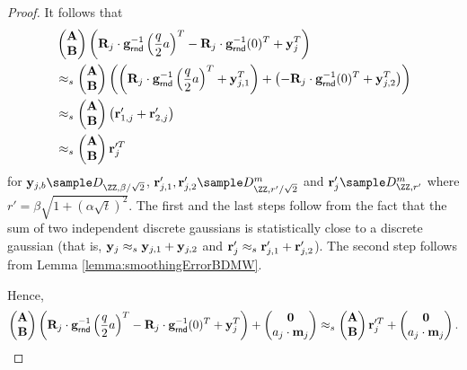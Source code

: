 \begin{proof}
      It follows that
      \begin{align*}
         & \begin{pmatrix} \mathbf{A} \\ \mathbf{B}\end{pmatrix}\left(\mathbf{R}_j\cdot\mathbf{g}^{-1}_\mathsf{rnd}\left(\frac{q}{2}a\right) ^T- \mathbf{R}_j\cdot \mathbf{g}^{-1}_\mathsf{rnd}(0)^T + \mathbf{y}_j^T \right) \\ &\approx_s\begin{pmatrix} \mathbf{A} \\ \mathbf{B}\end{pmatrix}\left(\left(\mathbf{R}_j\cdot\mathbf{g}^{-1}_\mathsf{rnd}\left(\frac{q}{2}a\right) ^T + \mathbf{y}_{j,1}^T\right)+\left(- \mathbf{R}_j\cdot \mathbf{g}^{-1}_\mathsf{rnd}(0)^T + \mathbf{y}_{j,2}^T\right) \right)\\ 
          &\approx_s \begin{pmatrix} \mathbf{A} \\ \mathbf{B}\end{pmatrix}\left(\mathbf{r}_{1,j}'+\mathbf{r}_{2,j}' \right)\\ 
          &\approx_s \begin{pmatrix}
    \mathbf{A} \\ \mathbf{B}
    \end{pmatrix}\mathbf{r}_j'^T
      \end{align*}  for $\yn_{j,b}\sample D_{\ZZ,\beta/\sqrt{2}}$, $\rn_{j,1}',\rn_{j,2}'\sample D_{\ZZ,r'/\sqrt{2}}^m$ and $\rn_j'\sample D_{\ZZ,r'}^m$ where $r'=\beta\sqrt{1+\left(\alpha\sqrt{t}\right)^2}$. The first and the last steps follow from the fact that the sum of two independent discrete gaussians is statistically close to a discrete gaussian (that is, $\mathbf{y}_j\approx_s\mathbf{y}_{j,1}+\mathbf{y}_{j,2}$ and $\mathbf{r}_j'\approx_s\mathbf{r}_{j,1}'+\mathbf{r}'_{j,2}$). The second step follows from Lemma \ref{lemma:smoothingErrorBDMW}. %
      
      Hence, $$ 
    \begin{pmatrix} \mathbf{A} \\ \mathbf{B}\end{pmatrix}\left(\mathbf{R}_j\cdot \mathbf{g}^{-1}_\mathsf{rnd}\left(\frac{q}{2} a\right)^T - \mathbf{R}_j\cdot\mathbf{g}^{-1}_\mathsf{rnd}(0)^T + \mathbf{y}_j^T \right) + \begin{pmatrix}
    \mathbf{0} \\ a_j\cdot\mathbf{m}_j
    \end{pmatrix}\approx_s  
    \begin{pmatrix} \mathbf{A} \\ \mathbf{B}\end{pmatrix}\mathbf{r}_j'^T + \begin{pmatrix}
    \mathbf{0} \\ a_j\cdot\mathbf{m}_j
    \end{pmatrix}.$$ 
    

\end{proof}

